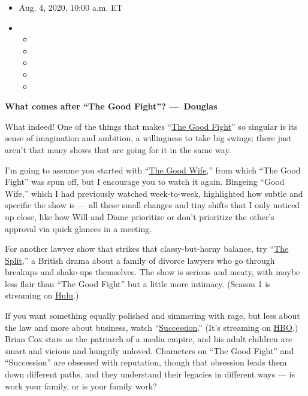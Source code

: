 \begin{itemize}
\item
  Aug. 4, 2020, 10:00 a.m. ET
\item
  \begin{itemize}
  \item
  \item
  \item
  \item
  \item
  \end{itemize}
\end{itemize}

\textbf{What comes after ``The Good Fight''? ---~Douglas}

What indeed! One of the things that makes
``\href{https://www.nytimes3xbfgragh.onion/watching/recommendations/the-good-wifehttps://www.nytimes3xbfgragh.onion/column/the-good-fight-tv-recaps}{The
Good Fight}'' so singular is its sense of imagination and ambition, a
willingness to take big swings; there just aren't that many shows that
are going for it in the same way.

I'm going to assume you started with
``\href{https://www.nytimes3xbfgragh.onion/watching/recommendations/the-good-wife}{The
Good Wife},'' from which ``The Good Fight'' was spun off, but I
encourage you to watch it again. Bingeing ``Good Wife,'' which I had
previously watched week-to-week, highlighted how subtle and specific the
show is --- all these small changes and tiny shifts that I only noticed
up close, like how Will and Diane prioritize or don't prioritize the
other's approval via quick glances in a meeting.

For another lawyer show that strikes that classy-but-horny balance, try
``\href{https://www.nytimes3xbfgragh.onion/watching/titles/the-split}{The
Split},'' a British drama about a family of divorce lawyers who go
through breakups and shake-ups themselves. The show is serious and
meaty, with maybe less flair than ``The Good Fight'' but a little more
intimacy. (Season 1 is streaming on
\href{https://www.hulu.com/series/the-split-5d1de53d-d263-48b9-b44c-75410ef9b9f4}{Hulu}.)

If you want something equally polished and simmering with rage, but less
about the law and more about business, watch
``\href{https://www.nytimes3xbfgragh.onion/spotlight/succession}{Succession}.''
(It's streaming on \href{https://www.hbo.com/succession}{HBO}.) Brian
Cox stars as the patriarch of a media empire, and his adult children are
smart and vicious and hungrily unloved. Characters on ``The Good Fight''
and ``Succession'' are obsessed with reputation, though that obsession
leads them down different paths, and they understand their legacies in
different ways --- is work your family, or is your family work?


